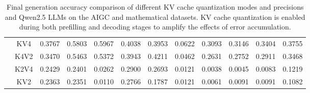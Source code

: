 \begin{table}[ht]
{\begin{tabular}{ c c | r r r r r r r r r  | r }
& KV4 & 0.3767 & 0.5803 & 0.5967 & 0.4038 & 0.3953 & 0.0622 & 0.3093 & 0.3146 & 0.3404 & 0.3755 \\
& K4V2 & 0.3470 & 0.5463 & 0.5372 & 0.3943 & 0.4211 & 0.0462 & 0.2631 & 0.2752 & 0.2911 & \colorbox{blue!30}{0.3468} \\
& K2V4 & 0.2429 & 0.2401 & 0.0262 & 0.2900 & 0.2693 & 0.0121 & 0.0038 & 0.0045 & 0.0083 & \colorbox{blue!30}{0.1219} \\
& KV2 & 0.2363 & 0.2351 & 0.0110 & 0.2766 & 0.1787 & 0.0121 & 0.0061 & 0.0091 & 0.0091 & \colorbox{blue!30}{0.1082} \\
\bottomrule
\end{tabular}
}
\caption{Final generation accuracy comparison of different KV cache quantization modes and precisions and Qwen2.5 LLMs on the AIGC and mathematical datasets. KV cache quantization is enabled during both prefilling and decoding stages to amplify the effects of error accumulation.}
\label{tab:kvcache_quant_results_aigc_gsm8k_datasets_quant_modes_models_both_pd_enabled_kvquant_qwen2.5}
\end{table}

